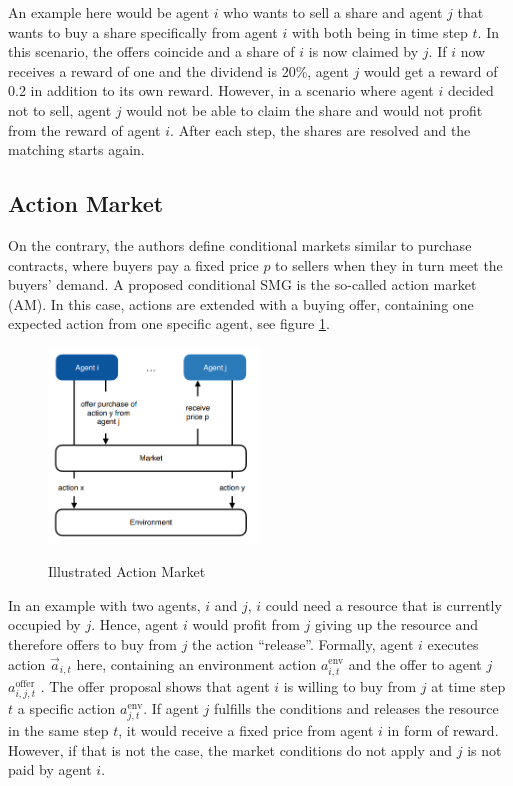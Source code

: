 An example here would be agent $i$ who wants to sell a share and agent $j$ that wants to buy a share specifically from agent $i$ with both being in time step $t$. In this scenario, the offers coincide and a share of $i$ is now claimed by $j$. If $i$ now receives a reward of one and the dividend is 20\%, agent $j$ would get a reward of 0.2 in addition to its own reward. However, in a scenario where agent $i$ decided not to sell, agent $j$ would not be able to claim the share and would not profit from the reward of agent $i$. After each step, the shares are resolved and the matching starts again.

\subsection{Action Market}
On the contrary, the authors define conditional markets similar to purchase contracts, where buyers pay a fixed price $p$ to sellers when they in turn meet the buyers' demand. A proposed conditional SMG is the so-called action market (AM). In this case, actions are extended with a buying offer, containing one expected action from one specific agent, see figure \ref{fig:am}.

\begin{figure}[hpbt]
    \centering
    \includegraphics[width=0.5\textwidth]{pictures/SMG_am}\\
    \caption[Action Market]{Illustrated Action Market}\label{fig:am}
\end{figure}

In an example with two agents, $i$ and $j$, $i$ could need a resource that is currently occupied by $j$. Hence, agent $i$ would profit from $j$ giving up the resource and therefore offers to buy from $j$ the action ``release''. Formally, agent $i$ executes action $\overrightarrow{a}_{i,t}$ here, containing an environment action $a^{\text{env}}_{i,t}$ and the offer to agent $j$ $a^{\text{offer}}_{i,j,t}$ \cite{scbe21}. The offer proposal shows that agent $i$ is willing to buy from $j$ at time step $t$ a specific action $a^{\text{env}}_{j,t}$. If agent $j$ fulfills the conditions and releases the resource in the same step $t$, it would receive a fixed price from agent $i$ in form of reward. However, if that is not the case, the market conditions do not apply and $j$ is not paid by agent $i$.

